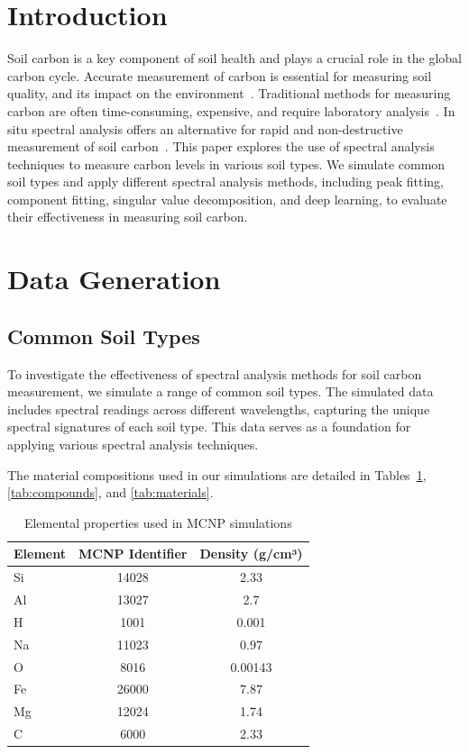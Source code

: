 \documentclass[review]{elsarticle}
\begin{document}
\linenumbers

\section{Introduction}

Soil carbon is a key component of soil health and plays a crucial role in the global carbon cycle. Accurate measurement of carbon is essential for measuring soil quality, and its impact on the environment~\cite{lal_soil_2018}. Traditional methods for measuring carbon are often time-consuming, expensive, and require laboratory analysis~\cite{smith_how_2020}. In situ spectral analysis offers an alternative for rapid and non-destructive measurement of soil carbon~\cite{yakubova_tagged_2019}. This paper explores the use of spectral analysis techniques to measure carbon levels in various soil types. We simulate common soil types and apply different spectral analysis methods, including peak fitting, component fitting, singular value decomposition, and deep learning, to evaluate their effectiveness in measuring soil carbon.

\section{Data Generation}

\subsection{Common Soil Types}

To investigate the effectiveness of spectral analysis methods for soil carbon measurement, we simulate a range of common soil types. The simulated data includes spectral readings across different wavelengths, capturing the unique spectral signatures of each soil type. This data serves as a foundation for applying various spectral analysis techniques.

The material compositions used in our simulations are detailed in Tables~\ref{tab:elements}, \ref{tab:compounds}, and \ref{tab:materials}.

\begin{table}[H]
\centering
\caption{Elemental properties used in MCNP simulations}
\label{tab:elements}
\begin{tabular}{@{}lcc@{}}
\toprule
Element & MCNP Identifier & Density (g/cm³) \\
\midrule
Si & 14028 & 2.33 \\
Al & 13027 & 2.7 \\
H & 1001 & 0.001 \\
Na & 11023 & 0.97 \\
O & 8016 & 0.00143 \\
Fe & 26000 & 7.87 \\
Mg & 12024 & 1.74 \\
C & 6000 & 2.33 \\
\bottomrule
\end{tabular}
\end{table}
\end{document}
